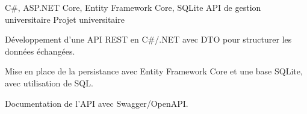 
\begin{cventries}
  \cventry
    {C\#, ASP.NET Core, Entity Framework Core, SQLite}
    {API de gestion universitaire}
    {Projet universitaire}
    {}
    {
      \begin{cvitems}
        \item {Développement d’une API REST en C\#/.NET avec DTO pour structurer les données échangées.}
        \item {Mise en place de la persistance avec Entity Framework Core et une base SQLite, avec utilisation de SQL.}
        \item {Documentation de l’API avec Swagger/OpenAPI.}
      \end{cvitems}
    }
\end{cventries}

